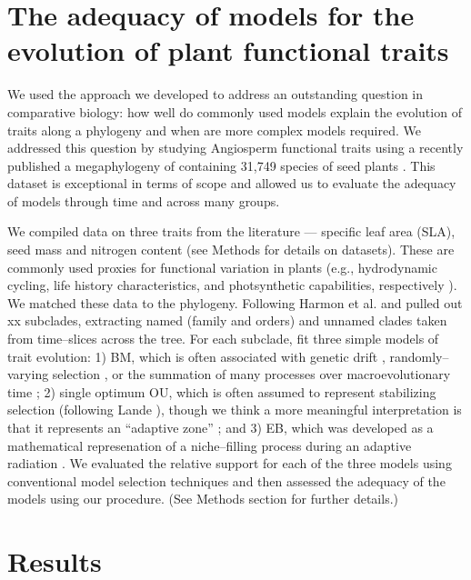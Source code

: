 \documentclass[a4paper,12pt]{article}
\begin{document}
\section{The adequacy of models for the evolution of plant functional traits}

We used the approach we developed to address an outstanding question in comparative biology: how well do commonly used models explain the evolution of traits along a phylogeny and when are more complex models required. We addressed this question by studying Angiosperm functional traits using a recently published a megaphylogeny of containing 31,749 species of seed plants \citep{Zanne2013}. This dataset is exceptional in terms of scope and allowed us to evaluate the adequacy of models through time and across many groups.  

We compiled data on three traits from the literature --- specific leaf area (SLA), seed mass and nitrogen content (see Methods for details on datasets). These are commonly used proxies for functional variation in plants (e.g., hydrodynamic cycling, life history characteristics, and photsynthetic capabilities, respectively \citep{Westoby2002}). We  matched these data to the phylogeny. Following Harmon et al. \citep{Harmon2010} and pulled out xx subclades, extracting named (family and orders) and unnamed clades taken from time--slices across the tree. For each subclade, fit three simple models of trait evolution: 1) BM, which is often associated with genetic drift \citep{Lande1976, Felsenstein1988, Lynch1990, HansenMartins1996}, randomly--varying selection \citep{Felsenstein1973}, or the summation of many processes over macroevolutionary time \citep{HansenMartins1996, Uyeda2011, PennellPE}; 2) single optimum OU, which is often assumed to represent stabilizing selection (following Lande \citep{Lande1976}), though we think a more meaningful interpretation is that it represents an ``adaptive zone'' \citep{Arnold2001, Hansen2012book PennellHarmon}; and 3) EB, which was developed as a mathematical represenation of a niche--filling process during an adaptive radiation \citep{Harmon2010, SlaterPennell}. We evaluated the relative support for each of the three models using conventional model selection techniques and then assessed the adequacy of the models using our procedure. (See Methods section for further details.) 

\section{Results}
\end{document}
